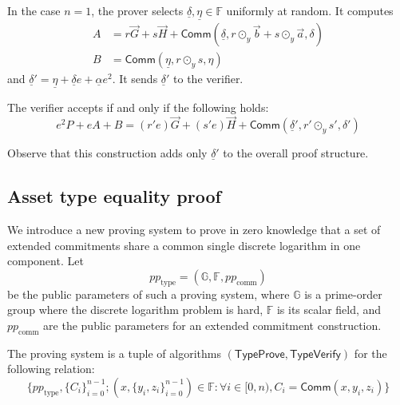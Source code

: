 \documentclass{article}
\newcommand{\G}{\mathbb{G}}
\newcommand{\F}{\mathbb{F}}
\newcommand{\func}[1]{\mathsf{#1}}
\newcommand{\comm}{\func{Comm}}
\begin{document}
In the case $n = 1$, the prover selects $\underline{\delta}, \underline{\eta} \in \F$ uniformly at random.
It computes
\begin{align*}
    A &= r\vec{G} + s\vec{H} + \comm(\underline{\delta}, r \odot_y \vec{b} + s \odot_y \vec{a}, \delta) \\
    B &= \comm(\underline{\eta}, r \odot_y s, \eta)
\end{align*}
and $\underline{\delta}' = \underline{\eta} + \underline{\delta} e + \underline{\alpha} e^2$.
It sends $\underline{\delta}'$ to the verifier.

The verifier accepts if and only if the following holds:
$$e^2 P + eA + B = (r'e)\vec{G} + (s'e)\vec{H} + \comm(\underline{\delta}', r' \odot_y s', \delta')$$

Observe that this construction adds only $\underline{\delta}'$ to the overall proof structure.


\subsection{Asset type equality proof}

We introduce a new proving system to prove in zero knowledge that a set of extended commitments share a common single discrete logarithm in one component.
Let $$pp_{\text{type}} = (\G, \F, pp_{\text{comm}})$$ be the public parameters of such a proving system, where $\G$ is a prime-order group where the discrete logarithm problem is hard, $\F$ is its scalar field, and $pp_{\text{comm}}$ are the public parameters for an extended commitment construction.

The proving system is a tuple of algorithms $(\func{TypeProve}, \func{TypeVerify})$ for the following relation:
$$\{ pp_{\text{type}}, \{C_i\}_{i=0}^{n-1} ; (x, \{y_i, z_i\}_{i=0}^{n-1}) \in \F : \forall i \in [0,n), C_i = \comm(x, y_i, z_i) \}$$
\end{document}
